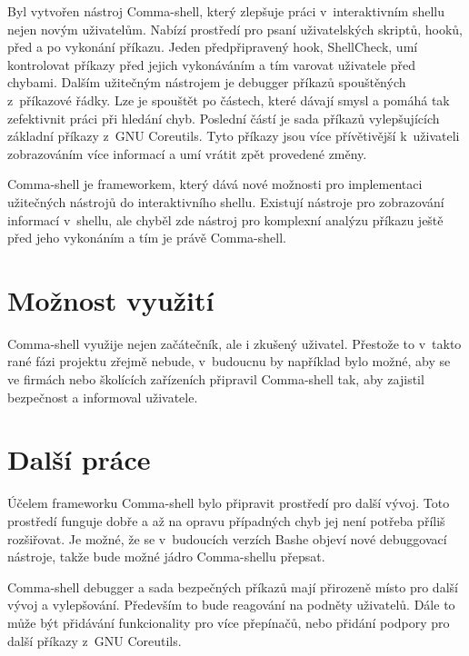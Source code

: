 \documentclass[thesis=M,czech]{FITthesis}[2012/06/26]
\begin{document}
\begin{conclusion}

Byl vytvořen nástroj Comma-shell, který zlepšuje práci v~interaktivním shellu nejen novým uživatelům. Nabízí prostředí pro psaní uživatelských skriptů, hooků, před a po vykonání příkazu. Jeden předpřipravený hook, ShellCheck, umí kontrolovat příkazy před jejich vykonáváním a tím varovat uživatele před chybami. Dalším užitečným nástrojem je debugger příkazů spouštěných z~příkazové řádky. Lze je spouštět po částech, které dávají smysl a pomáhá tak zefektivnit práci při hledání chyb. Poslední částí je sada příkazů vylepšujících základní příkazy z~GNU Coreutils. Tyto příkazy jsou více přívětivější k~uživateli zobrazováním více informací a umí vrátit zpět provedené změny.

Comma-shell je frameworkem, který dává nové možnosti pro implementaci užitečných nástrojů do interaktivního shellu. Existují nástroje pro zobrazování informací v~shellu, ale chyběl zde nástroj pro komplexní analýzu příkazu ještě před jeho vykonáním a tím je právě Comma-shell.


\section{Možnost využití}

Comma-shell využije nejen začátečník, ale i zkušený uživatel. Přestože to v~takto rané fázi projektu zřejmě nebude, v~budoucnu by například bylo možné, aby se ve firmách nebo školících zařízeních připravil Comma-shell tak, aby zajistil bezpečnost a informoval uživatele.


\section{Další práce}

Účelem frameworku Comma-shell bylo připravit prostředí pro další vývoj. Toto prostředí funguje dobře a až na opravu případných chyb jej není potřeba příliš rozšiřovat. Je možné, že se v~budoucích verzích Bashe objeví nové debuggovací nástroje, takže bude možné jádro Comma-shellu přepsat.

Comma-shell debugger a sada bezpečných příkazů mají přirozeně místo pro další vývoj a vylepšování. Především to bude reagování na podněty uživatelů. Dále to může být přidávání funkcionality pro více přepínačů, nebo přidání podpory pro další příkazy z~GNU Coreutils.


\end{conclusion}
\end{document}
